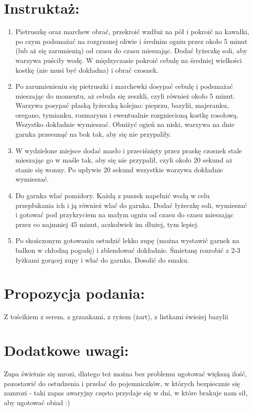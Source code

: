 \documentclass[a4paper,10pt]{book}
\begin{document}
\section*{Instruktaż:}
\begin{enumerate}
    \item Pietruszkę oraz marchew obrać, przekroić wzdłuż na pół i pokroić na kawałki, po czym podsmażać na rozgrzanej oliwie i średnim ogniu przez około 5 minut (lub aż się zarumienią) od czasu do czasu mieszając. Dodać łyżeczkę soli, aby warzywa puściły wodę. W międzyczasie pokroić cebulę na średniej wielkości kostkę (nie musi być dokładna) i obrać czosnek.
    \item Po zarumienieniu się pietruszki i marchewki dosypać cebulę i podsmażać mieszając do momentu, aż cebula się zeszkli, czyli również około 5 minut. Warzywa posypać płaską łyżeczką kolejno: pieprzu, bazylii, majeranku, oregano, tymianku, rozmarynu i ewentualnie rozgniecioną kostkę rosołową. Wszystko dokładnie wymieszać. Obniżyć ogień na niski, warzywa na dnie garnka przesunąć na bok tak, aby się nie przypaliły.
    \item W wydzielone miejsce dodać masło i przeciśnięty przez praskę czosnek stale mieszając go w maśle tak, aby się nie przypalił, czyli około 20 sekund aż stanie się wonny. Po upływie 20 sekund wszystkie warzywa dokładnie wymieszać.
    \item Do garnka wlać pomidory. Każdą z puszek napełnić wodą w celu przepłukania ich i ją również wlać do garnka. Dodać łyżeczkę soli, wymieszać i gotować pod przykryciem na małym ogniu od czasu do czasu mieszając przez co najmniej 45 minut, aczkolwiek im dłużej, tym lepiej.
    \item Po skończonym gotowaniu ostudzić lekko zupę (można wystawić garnek na balkon w chłodną pogodę) i zblendować dokładnie. Śmietanę rozrobić z 2-3 łyżkami gorącej zupy i wlać do garnka. Dosolić do smaku.
\end{enumerate}

\vspace{0.5cm} 

\small
\section*{Propozycja podania:}
Z tościkiem z serem, z grzankami, z ryżem (żart), z listkami świeżej bazylii

\vspace{0.3cm}

\section*{Dodatkowe uwagi:}
Zupa świetnie się mrozi, dlatego też można bez problemu ugotować większą ilość, pozostawić do ostudzenia i przelać do pojemniczków, w których bezpiecznie się zamrozi - taki zapas awaryjny często przydaje się w dni, w które brakuje nam sił, aby ugotować obiad :)
\end{document}
